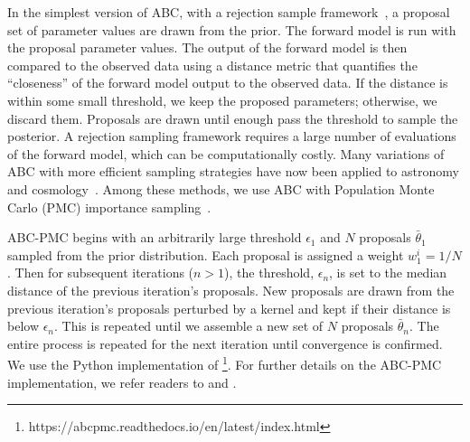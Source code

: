 In the simplest version of ABC, with a rejection sample
framework~\citep{pritchard1999}, a proposal set of parameter values are drawn
from the prior. The forward model is run with the proposal parameter values.
The output of the forward model is then compared to the observed data using
a distance metric that quantifies the ``closeness'' of the forward model
output to the observed data. 
If the distance is within some small threshold, we keep the proposed
parameters; otherwise, we discard them.  Proposals are
drawn until enough pass the threshold to sample the posterior. A
rejection sampling framework requires a large number of evaluations of the
forward model, which
can be computationally costly. Many variations of ABC with more efficient
sampling strategies have now been applied to astronomy and
cosmology~\citep[\eg][]{cameron2012, weyant2013, ishida2015, lin2016, alsing2018}.
Among these methods, we use ABC with Population Monte Carlo (PMC) 
importance sampling~\citep{hahn2017a, hahn2017b, hahn2019a}.

ABC-PMC begins with an arbitrarily large threshold $\epsilon_1$ and $N$ proposals 
$\bar{\theta}_1$ sampled from the prior distribution. Each proposal is
assigned a weight $w^i_1 = 1/N$. Then for subsequent iterations ($n > 1$), the 
threshold, $\epsilon_n$, is set to the median distance of the previous iteration's
proposals. New proposals are drawn from the previous iteration's proposals perturbed 
by a kernel and kept if their distance is below $\epsilon_n$. This is repeated
until we assemble a new set of $N$ proposals $\bar{\theta}_n$. The entire
process is repeated for the next iteration until convergence is confirmed. 
We use the Python implementation of
\cite{akeret2015}\footnote{https://abcpmc.readthedocs.io/en/latest/index.html}.
For further details on the ABC-PMC implementation, we refer readers to \cite{hahn2017b}
and \cite{hahn2019a}.

